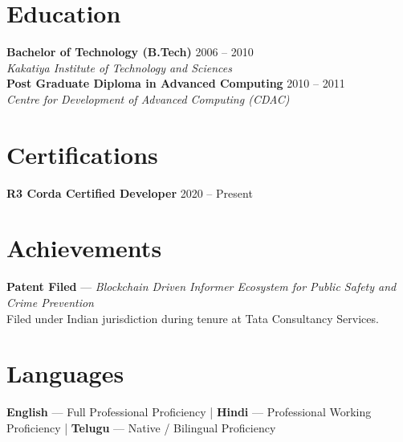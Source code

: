 \documentclass[11pt,a4paper]{article}
\begin{document}
\section*{Education}
\noindent\textbf{Bachelor of Technology (B.Tech)} \hfill 2006 -- 2010\\
\textit{Kakatiya Institute of Technology and Sciences}\\[0.4em]
\noindent\textbf{Post Graduate Diploma in Advanced Computing} \hfill 2010 -- 2011\\
\textit{Centre for Development of Advanced Computing (CDAC)}

\section*{Certifications}
\noindent\textbf{R3 Corda Certified Developer} \hfill 2020 -- Present

\section*{Achievements}
\noindent\textbf{Patent Filed} --- \textit{Blockchain Driven Informer Ecosystem for Public Safety and Crime Prevention}\\
Filed under Indian jurisdiction during tenure at Tata Consultancy Services.

\section*{Languages}
\textbf{English} --- Full Professional Proficiency \;|\; \textbf{Hindi} --- Professional Working Proficiency \;|\; \textbf{Telugu} --- Native / Bilingual Proficiency
\end{document}
